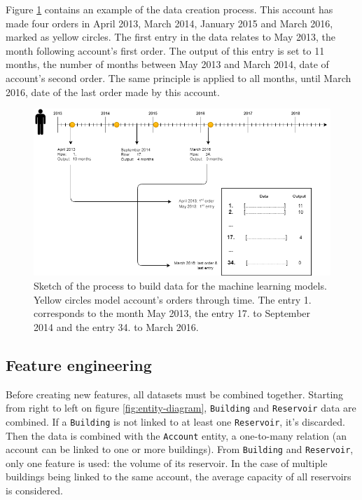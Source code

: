 Figure \ref{fig:data-build-example} contains an example of the data creation process. This account has made four orders in April 2013, March 2014, January 2015 and March 2016, marked as yellow circles. The first entry in the data relates to May 2013, the month following account's first order. The output of this entry is set to 11 months, the number of months between May 2013 and March 2014, date of account's second order. The same principle is applied to all months, until March 2016, date of the last order made by this account.

\begin{figure}[h]
    \hspace{-1cm}
    \includegraphics[width=17cm]{images/data-build-ml-example.png}
    \caption[Process to build data for machine learning]{Sketch of the process to build data for the machine learning models. Yellow circles model account's orders through time. The entry 1. corresponds to the month May 2013, the entry 17. to September 2014 and the entry 34. to March 2016.}
    \label{fig:data-build-example}
\end{figure}


\subsection{Feature engineering}\label{sec:ml-features}

Before creating new features, all datasets must be combined together. Starting from right to left on figure \ref{fig:entity-diagram}, \texttt{Building} and \texttt{Reservoir} data are combined. If a \texttt{Building} is not linked to at least one \texttt{Reservoir}, it's discarded. Then the data is combined with the \texttt{Account} entity, a one-to-many relation (an account can be linked to one or more buildings). From \texttt{Building} and \texttt{Reservoir}, only one feature is used: the volume of its reservoir. In the case of multiple buildings being linked to the same account, the average capacity of all reservoirs is considered.

